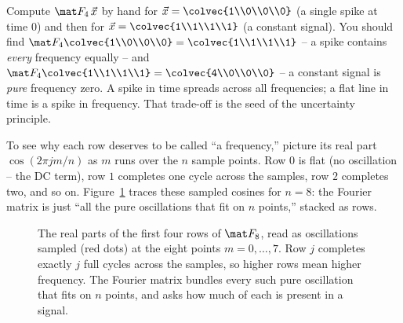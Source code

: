 \begin{labbox}
Compute $\mat F_4\,\vec x$ by hand for $\vec x = \colvec{1\\0\\0\\0}$ (a single
spike at time $0$) and then for $\vec x=\colvec{1\\1\\1\\1}$ (a constant signal).
You should find $\mat F_4\colvec{1\\0\\0\\0}=\colvec{1\\1\\1\\1}$ -- a spike
contains \emph{every} frequency equally -- and $\mat F_4\colvec{1\\1\\1\\1}=
\colvec{4\\0\\0\\0}$ -- a constant signal is \emph{pure} frequency zero. A spike in
time spreads across all frequencies; a flat line in time is a spike in frequency.
That trade-off is the seed of the uncertainty principle.
\end{labbox}

To see why each row deserves to be called ``a frequency,'' picture its real part
$\cos(2\pi jm/n)$ as $m$ runs over the $n$ sample points. Row $0$ is flat (no
oscillation -- the DC term), row $1$ completes one cycle across the samples, row
$2$ completes two, and so on. Figure~\ref{ch32:fourierrows} traces these sampled
cosines for $n=8$: the Fourier matrix is just ``all the pure oscillations that fit
on $n$ points,'' stacked as rows.

\begin{figure}[H]
\centering
{}
\caption{The real parts of the first four rows of $\mat F_8$, read as oscillations
sampled (red dots) at the eight points $m=0,\dots,7$. Row $j$ completes exactly $j$
full cycles across the samples, so higher rows mean higher frequency. The Fourier
matrix bundles every such pure oscillation that fits on $n$ points, and asks how
much of each is present in a signal.}
\label{ch32:fourierrows}
\end{figure}


